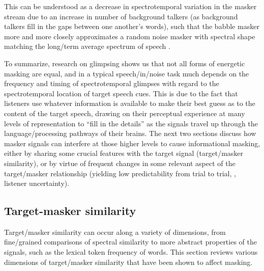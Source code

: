 This can be understood as a decrease in spectrotemporal variation in the masker stream due to an increase in number of background talkers (as background talkers fill in the gaps between one another’s words), such that the babble masker more and more closely approximates a random noise masker with spectral shape matching the long\-/term average spectrum of speech \citep{SimpsonCooke2005}.

To summarize, research on glimpsing shows us that not all forms of energetic masking are equal, and in a typical speech\-/in\-/noise task much depends on the frequency and timing of spectrotemporal glimpses with regard to the spectrotemporal location of target speech cues.  This is due to the fact that listeners use whatever information is available to make their best guess as to the content of the target speech, drawing on their perceptual experience at many levels of representation to “fill in the details” as the signals travel up through the language\-/processing pathways of their brains.  The next two sections discuss how masker signals can interfere at those higher levels to cause informational masking, either by sharing some crucial features with the target signal (target\-/masker similarity), or by virtue of frequent changes in some relevant aspect of the target\-/masker relationship (yielding low predictability from trial to trial, \ie, listener uncertainty).

\subsection{Target-masker similarity\label{sec:Similarity}}
Target\-/masker similarity can occur along a variety of dimensions, from fine\-/grained comparisons of spectral similarity to more abstract properties of the signals, such as the lexical token frequency of words.  This section reviews various dimensions of target\-/masker similarity that have been shown to affect masking.

